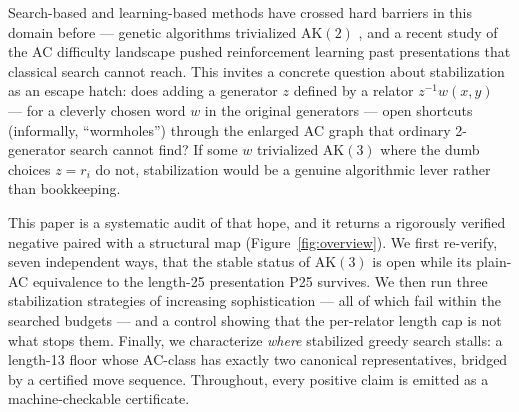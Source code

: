 Search-based and learning-based methods have crossed hard barriers in this domain before
--- genetic algorithms trivialized $\mathrm{AK}(2)$ \cite{miasnikov1999genetic}, and a
recent study of the AC difficulty landscape \cite{fagan2026twohump} pushed reinforcement
learning past presentations that classical search cannot reach. This invites a concrete
question about stabilization as an escape hatch: does adding a generator $z$ defined by a
relator $z^{-1}w(x,y)$ --- for a cleverly chosen word $w$ in the original generators --- open
shortcuts (informally, ``wormholes'') through the enlarged AC graph that ordinary
2-generator search cannot find? If some $w$ trivialized $\mathrm{AK}(3)$ where the dumb
choices $z=r_i$ do not, stabilization would be a genuine algorithmic lever rather than
bookkeeping.

This paper is a systematic audit of that hope, and it returns a rigorously verified
negative paired with a structural map (Figure~\ref{fig:overview}). We first re-verify,
seven independent ways, that the stable status of $\mathrm{AK}(3)$ is open while its
plain-AC equivalence to the length-25 presentation P25 survives. We then run three
stabilization strategies of increasing sophistication --- all of which fail within the
searched budgets --- and a control showing that the per-relator length cap is not what stops
them. Finally, we characterize \emph{where} stabilized greedy search stalls: a length-13
floor whose AC-class has exactly two canonical representatives, bridged by a certified
move sequence. Throughout, every positive claim is emitted as a machine-checkable
certificate.

